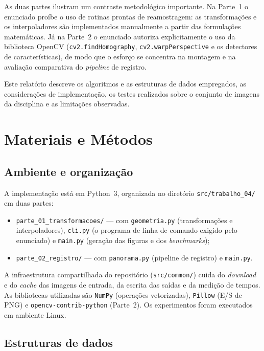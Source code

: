 \documentclass[12pt,a4paper]{article}
\newcommand{\arquivo}[1]{\nolinkurl{#1}}
\begin{document}
As duas partes ilustram um contraste metodológico importante. Na Parte~1 o
enunciado proíbe o uso de rotinas prontas de reamostragem: as transformações e
os interpoladores são implementados manualmente a partir das formulações
matemáticas. Já na Parte~2 o enunciado autoriza explicitamente o uso da
biblioteca OpenCV (\texttt{cv2.findHomography}, \texttt{cv2.warpPerspective} e
os detectores de características), de modo que o esforço se concentra na
montagem e na avaliação comparativa do \emph{pipeline} de registro.

Este relatório descreve os algoritmos e as estruturas de dados empregados, as
considerações de implementação, os testes realizados sobre o conjunto de
imagens da disciplina e as limitações observadas.

\section{Materiais e Métodos}

\subsection{Ambiente e organização}

A implementação está em Python~3, organizada no diretório
\arquivo{src/trabalho\_04/} em duas partes:

\begin{itemize}
  \item \arquivo{parte\_01\_transformacoes/} --- com \arquivo{geometria.py}
    (transformações e interpoladores), \arquivo{cli.py} (o programa de linha
    de comando exigido pelo enunciado) e \arquivo{main.py} (geração das
    figuras e dos \emph{benchmarks});
  \item \arquivo{parte\_02\_registro/} --- com \arquivo{panorama.py} (pipeline
    de registro) e \arquivo{main.py}.
\end{itemize}

A infraestrutura compartilhada do repositório (\arquivo{src/common/}) cuida do
\emph{download} e do \emph{cache} das imagens de entrada, da escrita das saídas
e da medição de tempos. As bibliotecas utilizadas são \texttt{NumPy}
(operações vetorizadas), \texttt{Pillow} (E/S de PNG) e
\texttt{opencv-contrib-python} (Parte~2). Os experimentos foram executados em
ambiente Linux.

\subsection{Estruturas de dados}
\end{document}
